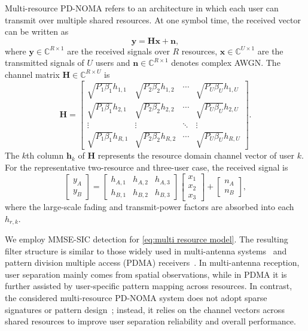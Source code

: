 Multi-resource PD-NOMA refers to an architecture in which each user can transmit over multiple shared resources. At one symbol time, the received vector can be written as
\begin{equation}
    \bm{y} = \bm{H}\bm{x} + \bm{n},
    \label{eq:multi resource model}
\end{equation}
where $\bm{y}\in\mathbb{C}^{R\times 1}$ are the received signals over $R$ resources, $\bm{x}\in\mathbb{C}^{U\times 1}$ are the transmitted signals of $U$ users and $\bm{n}\in\mathbb{C}^{R\times 1}$ denotes complex AWGN. 
The channel matrix $\bm{H}\in\mathbb{C}^{R\times U}$ is 
\begin{equation}
    \bm{H}=
    \begin{bmatrix}
    \sqrt{P_1\beta_1}h_{1,1} & \sqrt{P_2\beta_2}h_{1,2} & \cdots & \sqrt{P_U\beta_U}h_{1,U}\\
    \sqrt{P_1\beta_1}h_{2,1} & \sqrt{P_2\beta_2}h_{2,2} & \cdots & \sqrt{P_U\beta_U}h_{2,U}\\
    \vdots & \vdots & \ddots & \vdots\\
    \sqrt{P_1\beta_1}h_{R,1} & \sqrt{P_2\beta_2}h_{R,2} & \cdots & \sqrt{P_U\beta_U}h_{R,U}
    \end{bmatrix}.
\end{equation}
The $k$th column $\bm{h}_k$ of $\bm{H}$ represents the resource domain channel vector of user $k$.
For the representative two-resource and three-user case, the received signal is
\begin{equation}
    \begin{bmatrix}y_A\\y_B\end{bmatrix}
    =
    \begin{bmatrix}
    h_{A,1} & h_{A,2} & h_{A,3}\\
    h_{B,1} & h_{B,2} & h_{B,3}
    \end{bmatrix}
    \begin{bmatrix}x_1\\x_2\\x_3\end{bmatrix}
    +
    \begin{bmatrix}n_A\\n_B\end{bmatrix},
\end{equation}
where the large-scale fading and transmit-power factors are absorbed into each $h_{r,k}$.

We employ MMSE-SIC detection for \eqref{eq:multi resource model}. The resulting filter structure is similar to those widely used in multi-antenna systems~\cite{endo2012uplink,li2013advanced} and pattern division multiple access (PDMA) receivers~\cite{kong2016multiuser}. 
In multi-antenna reception, user separation mainly comes from spatial observations, while in PDMA it is further assisted by user-specific pattern mapping across resources. 
In contrast, the considered multi-resource PD-NOMA system does not adopt sparse signatures or pattern design~\cite{mohammadkarimi2018signature}; instead, it relies on the channel vectors across shared resources to improve user separation reliability and overall performance. 


